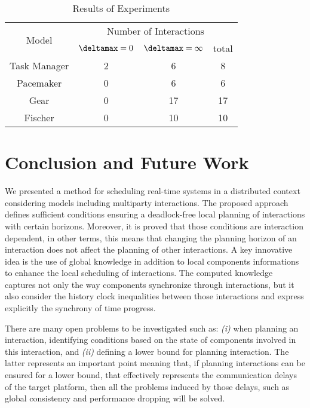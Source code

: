    \begin{table*}
     \caption{Results of Experiments}\label{t:2}
    \vspace*{3mm}
    \centering
    \begin{tabular}{| c || c | c  | c |}
      \hline
      \multirow{2}{*}{Model}             & \multicolumn{3}{c|}{Number of Interactions}\\\cline{2-4}
                                         & $\deltamax=0$ &$\deltamax=\infty$ & total\\\hline
      
      Task Manager                       &  2           & 6                & 8 \\\hline 
      Pacemaker                          &  0           & 6                & 6  \\ \hline
      Gear                               &  0           & 17               & 17 \\ \hline
      Fischer                            & 0            & 10               & 10 \\ \hline
    \end{tabular}
   \end{table*}
   \vspace{-1cm}
\section{Conclusion and Future Work}

We presented a method for scheduling real-time systems in a distributed context considering models including multiparty interactions.
The proposed approach defines sufficient conditions ensuring a deadlock-free local planning of interactions with certain horizons.
Moreover, it is proved that those conditions are interaction dependent, in other terms, this means that changing the planning horizon of an interaction
does not affect the planning of other interactions. A key innovative idea is the use of global knowledge in addition to local components informations to enhance
the local scheduling of interactions. The computed knowledge captures not only the way components synchronize through interactions, but it also 
consider the history clock inequalities between those interactions and express explicitly the synchrony of time progress. 

There are many open problems to be investigated such as: \emph{(i)} when planning an interaction, identifying conditions based on
the state of components involved in this interaction, and \emph{(ii)} defining a lower bound for planning interaction. The latter represents an important point
meaning that, if planning interactions can be ensured for a lower bound, that effectively represents the communication delays of the target platform, then all the problems
induced by those delays, such as global consistency and performance dropping will be solved. 
